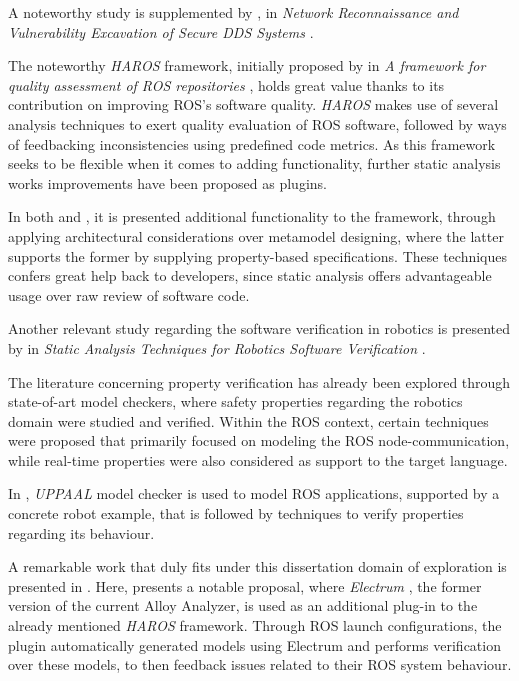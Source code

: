 A noteworthy study is supplemented by \citeauthor*{white2019network}, in \textit{Network Reconnaissance and Vulnerability Excavation of Secure DDS Systems} \cite{white2019network}.

The noteworthy \textit{HAROS} framework, initially proposed by \citeauthor{santos2016framework} in \textit{A framework for quality assessment of ROS repositories} \cite{santos2016framework}, holds great value thanks to its contribution on improving ROS's software quality. \textit{HAROS} makes use of several analysis techniques to exert quality evaluation of ROS software, followed by ways of feedbacking inconsistencies using predefined code metrics. As this framework seeks to be flexible when it comes to adding functionality, further static analysis works improvements have been proposed as plugins.

In both  and , it is presented additional functionality to the framework, through applying architectural considerations over metamodel designing, where the latter supports the former by supplying property-based specifications. These techniques confers great help back to developers, since static analysis offers advantageable usage over raw review of software code. 

Another relevant study regarding the software verification in robotics is presented by \citeauthor{cortesi2013static} in \textit{Static Analysis Techniques
for Robotics Software Verification} \cite{cortesi2013static}. 

The literature concerning property verification has already been explored through state-of-art model checkers, where safety properties regarding the robotics domain were studied and verified. Within the ROS context, certain techniques were proposed that primarily focused on modeling the ROS node-communication, while real-time properties were also considered as support to the target language.
 
In , \textit{UPPAAL} model checker is used to model ROS applications, supported by a concrete robot example, that is followed by techniques to verify properties regarding its behaviour. 

A remarkable work that duly fits under this dissertation domain of exploration is presented in . Here, \citeauthor{9341085} presents a notable proposal, where \textit{Electrum} \cite{lwspecification}, the former version of the current Alloy Analyzer, is used as an additional plug-in to the already mentioned \textit{HAROS} framework. Through ROS launch configurations, the plugin automatically generated models using Electrum and performs verification over these models, to then feedback issues related to their ROS system behaviour.

